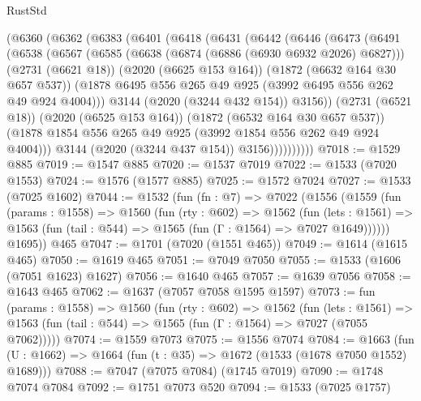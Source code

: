 \begin{lexlean}{RustStd}
\begin{coremodule}
      (@6360
        (@6362
          (@6383
            (@6401
              (@6418
                (@6431
                  (@6442
                    (@6446
                      (@6473
                        (@6491
                          (@6538
                            (@6567
                              (@6585
                                (@6638 (@6874 (@6886 (@6930 @6932 @2026) @6827)))
                                (@2731 (@6621 @18))
                                (@2020 (@6625 @153 @164))
                                (@1872 (@6632 @164 @30 @657 @537))
                                (@1878
                                  @6495
                                  @556
                                  @265
                                  @49
                                  @925
                                  (@3992 @6495 @556 @262 @49 @924 @4004)))
                              @3144
                              (@2020 (@3244 @432 @154))
                              @3156))
                          (@2731 (@6521 @18))
                          (@2020 (@6525 @153 @164))
                          (@1872 (@6532 @164 @30 @657 @537))
                          (@1878 @1854 @556 @265 @49 @925 (@3992 @1854 @556 @262 @49 @924 @4004)))
                        @3144
                        (@2020 (@3244 @437 @154))
                        @3156))))))))))
@7018 := @1529 @885
@7019 := @1547 @885
@7020 := @1537 @7019
@7022 := @1533 (@7020 @1553)
@7024 := @1576 (@1577 @885)
@7025 := @1572 @7024
@7027 := @1533 (@7025 @1602)
@7044 := @1532
    (fun (fn : @7) =>
    @7022
      (@1556
        (@1559
          (fun (params : @1558) =>
          @1560
            (fun (rty : @602) =>
            @1562
              (fun (lets : @1561) =>
              @1563 (fun (tail : @544) => @1565 (fun (Γ : @1564) => @7027 @1649))))))
        @1695))
    @465
@7047 := @1701 (@7020 (@1551 @465))
@7049 := @1614 (@1615 @465)
@7050 := @1619 @465
@7051 := @7049 @7050
@7055 := @1533 (@1606 (@7051 @1623) @1627)
@7056 := @1640 @465
@7057 := @1639 @7056
@7058 := @1643 @465
@7062 := @1637 (@7057 @7058 @1595 @1597)
@7073 := fun (params : @1558) =>
  @1560
    (fun (rty : @602) =>
    @1562
      (fun (lets : @1561) =>
      @1563 (fun (tail : @544) => @1565 (fun (Γ : @1564) => @7027 (@7055 @7062)))))
@7074 := @1559 @7073
@7075 := @1556 @7074
@7084 := @1663 (fun (U : @1662) => @1664 (fun (t : @35) => @1672 (@1533 (@1678 @7050 @1552) @1689)))
@7088 := @7047 (@7075 @7084) (@1745 @7019)
@7090 := @1748 @7074 @7084
@7092 := @1751 @7073 @520
@7094 := @1533 (@7025 @1757)

\end{coremodule}
\end{lexlean}
